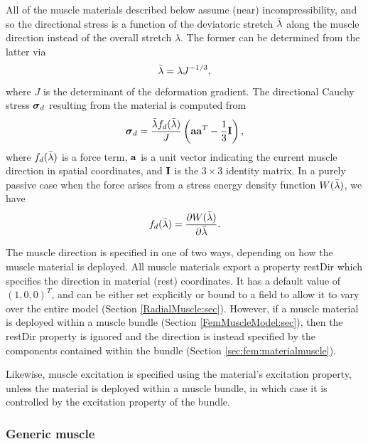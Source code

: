 All of the muscle materials described below assume (near)
incompressibility, and so the directional stress is a function of the
deviatoric stretch $\bar\lambda$ along the muscle direction instead of the
overall stretch $\lambda$.  The former can be determined from the
latter via
%
\begin{equation}
\bar\lambda = \lambda J^{-1/3},
\end{equation}
%
where $J$ is the determinant of the deformation gradient.  The
directional Cauchy stress $\boldsymbol\sigma_d$ resulting from the material is
computed from
%
\begin{equation}
\boldsymbol\sigma_d = \frac{\bar\lambda  f_d(\bar\lambda)}{J} 
\left( {\bf a} {\bf a}^T - \frac{1}{3}{\bf I} \right),
\end{equation}
%
where $f_d(\bar\lambda)$ is a force term, ${\bf a}$ is a unit vector indicating
the current muscle direction in spatial coordinates, and ${\bf I}$ is the $3 \times
3$ identity matrix. In a purely passive case when the force arises
from a stress energy density function $W(\bar\lambda)$, we have
%
\begin{equation}
f_d(\bar\lambda) = \frac{\partial W(\bar\lambda)}{\partial \bar\lambda}.
\end{equation}
%

The muscle direction is specified in one of two ways, depending on how
the muscle material is deployed. All muscle materials export a
property {\sf restDir} which specifies the direction in material
(rest) coordinates. It has a default value of $(1, 0, 0)^T$, and can
be either set explicitly or bound to a field to allow it to vary over the
entire model (Section \ref{RadialMuscle:sec}).  However, if a muscle
material is deployed within a muscle bundle
(Section \ref{FemMuscleModel:sec}), then the {\sf restDir} property is
ignored and the direction is instead specified by the
 components contained
within the bundle (Section \ref{sec:fem:materialmuscle}).

Likewise, muscle excitation is specified using the material's {\sf
excitation} property, unless the material is deployed within a muscle
bundle, in which case it is controlled by the {\sf excitation}
property of the bundle.

\subsubsection{Generic muscle}

